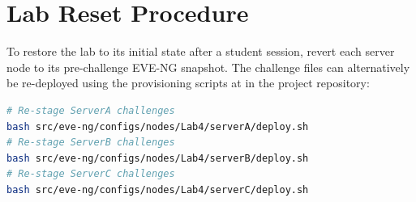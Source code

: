 \section*{Lab Reset Procedure}

To restore the lab to its initial state after a student session, revert each
server node to its pre-challenge EVE-NG snapshot. The challenge files can
alternatively be re-deployed using the provisioning scripts at
 in the project repository:

\begin{lstlisting}[language=bash]
# Re-stage ServerA challenges
bash src/eve-ng/configs/nodes/Lab4/serverA/deploy.sh
# Re-stage ServerB challenges
bash src/eve-ng/configs/nodes/Lab4/serverB/deploy.sh
# Re-stage ServerC challenges
bash src/eve-ng/configs/nodes/Lab4/serverC/deploy.sh
\end{lstlisting}
